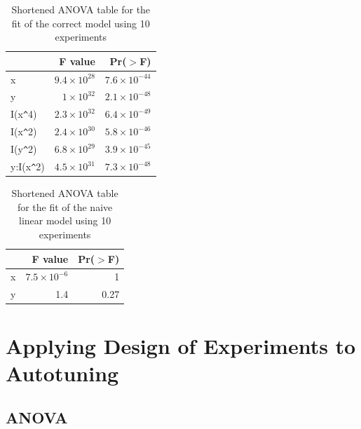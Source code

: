 \documentclass[conference]{IEEEtran}
\begin{document}
\begin{table}[ht]
\centering
\caption{Shortened ANOVA table for the fit of the correct model using 10 experiments}
\begingroup\small
\begin{tabular}{lrr}
  \toprule
 & F value & Pr($>$F) \\
  \midrule
x           & $9.4 \times 10^{28}$ & $7.6 \times 10^{-44}$ \\
  y           & $1 \times 10^{32}$ & $2.1 \times 10^{-48}$ \\
  I(x\verb|^|4)      & $2.3 \times 10^{32}$ & $6.4 \times 10^{-49}$ \\
  I(x\verb|^|2)      & $2.4 \times 10^{30}$ & $5.8 \times 10^{-46}$ \\
  I(y\verb|^|2)      & $6.8 \times 10^{29}$ & $3.9 \times 10^{-45}$ \\
  y:I(x\verb|^|2)    & $4.5 \times 10^{31}$ & $7.3 \times 10^{-48}$ \\
   \bottomrule
\end{tabular}
\endgroup
\end{table}

\begin{table}[ht]
\centering
\caption{Shortened ANOVA table for the fit of the naive linear model using 10 experiments}
\begingroup\small
\begin{tabular}{lrr}
  \toprule
 & F value & Pr($>$F) \\
  \midrule
x           & $7.5 \times 10^{-6}$ &   1 \\
  y           & 1.4 & 0.27 \\
   \bottomrule
\end{tabular}
\endgroup
\end{table}

\section{Applying Design of Experiments to Autotuning}
\label{sec:orga0098cd}
\subsection{ANOVA}
\label{sec:org7b84e8f}
\end{document}
